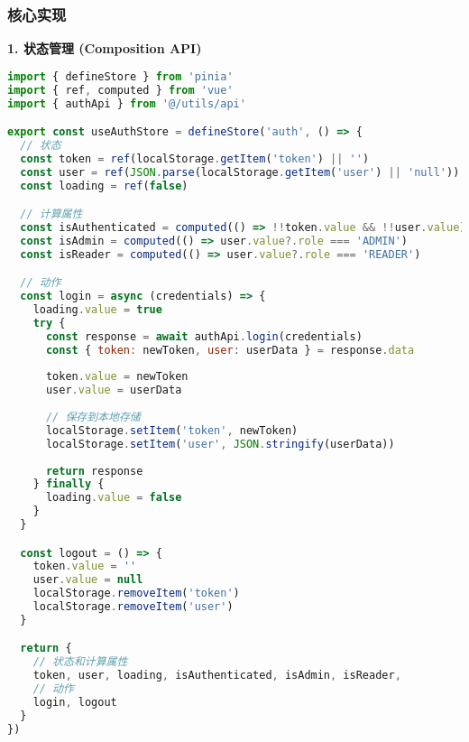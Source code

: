 \documentclass[12pt,a4paper]{article}
\begin{document}
\subsubsection{核心实现}

\textbf{1. 状态管理 (Composition API)}
\begin{lstlisting}[language=javascript]
import { defineStore } from 'pinia'
import { ref, computed } from 'vue'
import { authApi } from '@/utils/api'

export const useAuthStore = defineStore('auth', () => {
  // 状态
  const token = ref(localStorage.getItem('token') || '')
  const user = ref(JSON.parse(localStorage.getItem('user') || 'null'))
  const loading = ref(false)

  // 计算属性
  const isAuthenticated = computed(() => !!token.value && !!user.value)
  const isAdmin = computed(() => user.value?.role === 'ADMIN')
  const isReader = computed(() => user.value?.role === 'READER')

  // 动作
  const login = async (credentials) => {
    loading.value = true
    try {
      const response = await authApi.login(credentials)
      const { token: newToken, user: userData } = response.data
      
      token.value = newToken
      user.value = userData
      
      // 保存到本地存储
      localStorage.setItem('token', newToken)
      localStorage.setItem('user', JSON.stringify(userData))
      
      return response
    } finally {
      loading.value = false
    }
  }

  const logout = () => {
    token.value = ''
    user.value = null
    localStorage.removeItem('token')
    localStorage.removeItem('user')
  }

  return {
    // 状态和计算属性
    token, user, loading, isAuthenticated, isAdmin, isReader,
    // 动作
    login, logout
  }
})
\end{lstlisting}
\end{document}

